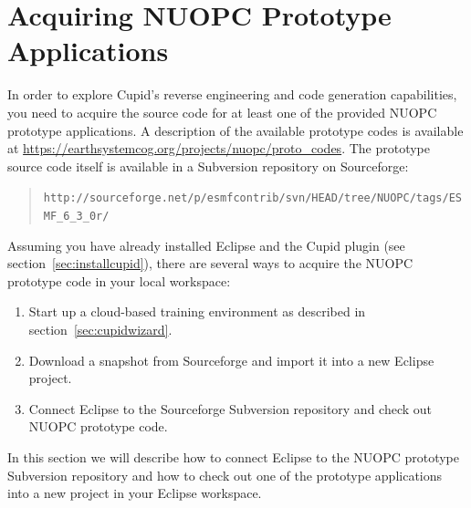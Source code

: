 \documentclass[oneside,11pt]{memoir}
\begin{document}
\section{Acquiring NUOPC Prototype Applications}

In order to explore Cupid's reverse engineering and code generation capabilities, you need to acquire the source code for at least one of the provided NUOPC prototype applications. A description of the available prototype codes is available at \href{https://earthsystemcog.org/projects/nuopc/proto\_codes}{https://earthsystemcog.org/projects/nuopc/proto\_codes}. The prototype source code itself is available in a Subversion repository on Sourceforge:

\begin{quote}
\texttt{http://sourceforge.net/p/esmfcontrib/svn/HEAD/tree/NUOPC/tags/ESMF\_6\_3\_0r/}
\end{quote}

Assuming you have already installed Eclipse and the Cupid plugin (see section~\ref{sec:installcupid}), there are several ways to acquire the NUOPC prototype code in your local workspace:
\begin{enumerate}
\item Start up a cloud-based training environment as described in section~\ref{sec:cupidwizard}.
\item Download a snapshot from Sourceforge and import it into a new Eclipse project.
\item Connect Eclipse to the Sourceforge Subversion repository and check out NUOPC prototype code.
\end{enumerate}

In this section we will describe how to connect Eclipse to the NUOPC prototype Subversion repository and how to check out one of the prototype applications into a new project in your Eclipse workspace.
\end{document}
